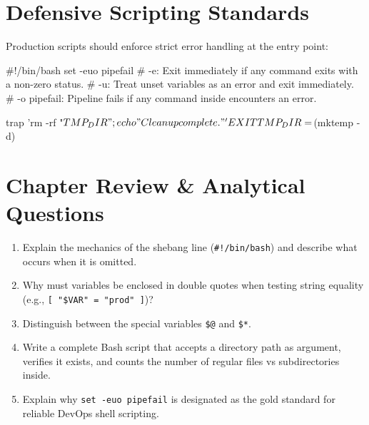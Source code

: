 \section{Defensive Scripting Standards}
Production scripts should enforce strict error handling at the entry point:
\begin{scriptbox}
#!/bin/bash
set -euo pipefail
# -e: Exit immediately if any command exits with a non-zero status.
# -u: Treat unset variables as an error and exit immediately.
# -o pipefail: Pipeline fails if any command inside encounters an error.

trap 'rm -rf "$TMP_DIR"; echo "Cleanup complete."' EXIT
TMP_DIR=$(mktemp -d)
\end{scriptbox}

\section{Chapter Review \& Analytical Questions}
\begin{enumerate}[leftmargin=1.5em]
    \item Explain the mechanics of the shebang line (\texttt{\#!/bin/bash}) and describe what occurs when it is omitted.
    \item Why must variables be enclosed in double quotes when testing string equality (e.g., \texttt{[ "\$VAR" = "prod" ]})?
    \item Distinguish between the special variables \texttt{\$@} and \texttt{\$*}.
    \item Write a complete Bash script that accepts a directory path as argument, verifies it exists, and counts the number of regular files vs subdirectories inside.
    \item Explain why \texttt{set -euo pipefail} is designated as the gold standard for reliable DevOps shell scripting.
\end{enumerate}
